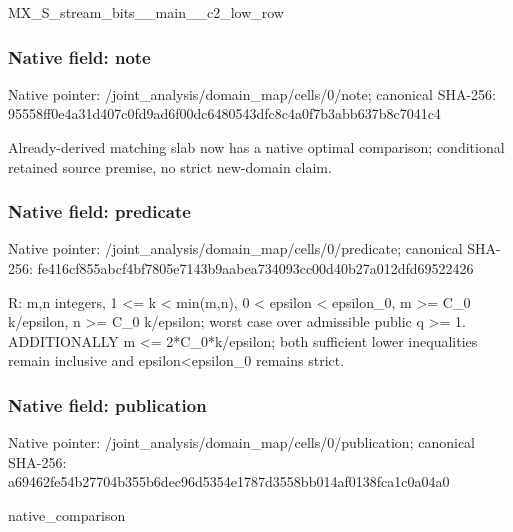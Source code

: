 \documentclass[10pt,a4paper]{article}
\begin{document}
\begingroup\raggedright\sloppy MX\_\allowbreak{}S\_\allowbreak{}stream\_\allowbreak{}bits\_\allowbreak{}\_\allowbreak{}main\_\allowbreak{}\_\allowbreak{}c2\_\allowbreak{}low\_\allowbreak{}row\par\endgroup

\subsubsection{Native field: note}
Native pointer: /joint\_\allowbreak{}analysis/domain\_\allowbreak{}map/cells/0/note; canonical SHA-256: 95558ff0e4a31d407c0fd9ad6f00dc6480543dfc8c4a0f7b3abb637b8c7041c4

\begingroup\raggedright\sloppy Already-derived matching slab now has a native optimal comparison;\allowbreak{} conditional retained source premise,\allowbreak{} no strict new-domain claim.\par\endgroup

\subsubsection{Native field: predicate}
Native pointer: /joint\_\allowbreak{}analysis/domain\_\allowbreak{}map/cells/0/predicate; canonical SHA-256: fe416cf855abcf4bf7805e7143b9aabea734093cc00d40b27a012dfd69522426

\begingroup\raggedright\sloppy R:\allowbreak{} m,\allowbreak{}n integers,\allowbreak{} 1 <=\allowbreak{} k < min(m,\allowbreak{}n),\allowbreak{} 0 < epsilon < epsilon\_\allowbreak{}0,\allowbreak{} m >=\allowbreak{} C\_\allowbreak{}0 k/\allowbreak{}epsilon,\allowbreak{} n >=\allowbreak{} C\_\allowbreak{}0 k/\allowbreak{}epsilon;\allowbreak{} worst case over admissible public q >=\allowbreak{} 1. ADDITIONALLY m <=\allowbreak{} 2*C\_\allowbreak{}0*k/\allowbreak{}epsilon;\allowbreak{} both sufficient lower inequalities remain inclusive and epsilon<epsilon\_\allowbreak{}0 remains strict.\par\endgroup

\subsubsection{Native field: publication}
Native pointer: /joint\_\allowbreak{}analysis/domain\_\allowbreak{}map/cells/0/publication; canonical SHA-256: a69462fe54b27704b355b6dec96d5354e1787d3558bb014af0138fca1c0a04a0

\begingroup\raggedright\sloppy native\_\allowbreak{}comparison\par\endgroup
\end{document}
